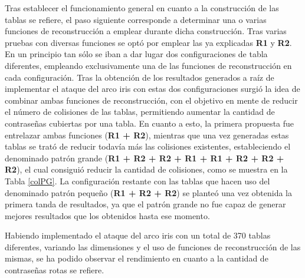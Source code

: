 \documentclass[12pt,spanish,listoffigures,listoftables]{tfgetsinf}
\begin{document}
Tras establecer el funcionamiento general en cuanto a la construcción de las tablas se refiere, el paso siguiente corresponde a determinar una o varias funciones de reconstrucción a emplear durante dicha construcción. Tras varias pruebas con diversas funciones se optó por emplear las ya explicadas \textbf{R1} y \textbf{R2}. En un principio tan sólo se iban a dar lugar dos configuraciones de tabla diferentes, empleando exclusivamente una de las funciones de reconstrucción en cada configuración. Tras la obtención de los resultados generados a raíz de implementar el ataque del arco iris con estas dos configuraciones surgió la idea de combinar ambas funciones de reconstrucción, con el objetivo en mente de reducir el número de colisiones de las tablas, permitiendo aumentar la cantidad de contraseñas cubiertas por una tabla. En cuanto a esto, la primera propuesta fue entrelazar ambas funciones (\textbf{R1 + R2}), mientras que una vez generadas estas tablas se trató de reducir todavía más las colisiones existentes, estableciendo el denominado patrón grande (\textbf{R1 + R2 + R2 + R1 + R1 + R2 + R2 + R2}), el cual consiguió reducir la cantidad de colisiones, como se muestra en la Tabla \ref{colPG}. La configuración restante con las tablas que hacen uso del denominado patrón pequeño (\textbf{R1 + R2 + R2}) se planteó una vez obtenida la primera tanda de resultados, ya que el patrón grande no fue capaz de generar mejores resultados que los obtenidos hasta ese momento.

Habiendo implementado el ataque del arco iris con un total de 370 tablas diferentes, variando las dimensiones y el uso de funciones de reconstrucción de las mismas, se ha podido observar el rendimiento en cuanto a la cantidad de contraseñas rotas se refiere.
\end{document}
